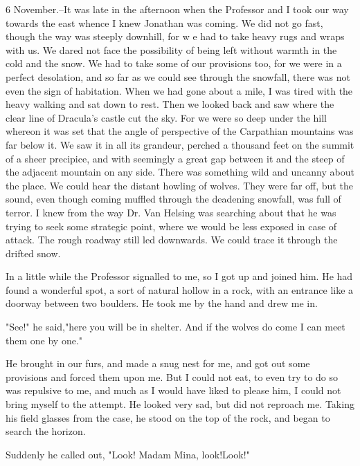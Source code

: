 6 November.--It was late in the afternoon when the Professor and I took our way towards the east whence I knew Jonathan was coming. We did not go fast, though the way was steeply downhill, for w e had to take heavy rugs and wraps with us. We dared not face the possibility of being left without warmth in the cold and the snow. We had to take some of our provisions too, for we were in a perfect desolation, and so far as we could see through the snowfall, there was not even the sign of habitation. When we had gone about a mile, I was tired with the heavy walking and sat down to rest. Then we looked back and saw where the clear line of Dracula's castle cut the sky. For we were so deep under the hill whereon it was set that the angle of perspective of the Carpathian mountains was far below it. We saw it in all its grandeur, perched a thousand feet on the summit of a sheer precipice, and with seemingly a great gap between it and the steep of the adjacent mountain on any side. There was something wild and uncanny about the place. We could hear the distant howling of wolves. They were far off, but the sound, even though coming muffled through the deadening snowfall, was full of terror. I knew from the way Dr. Van Helsing was searching about that he was trying to seek some strategic point, where we would be less exposed in case of attack. The rough roadway still led downwards. We could trace it through the drifted snow. 

In a little while the Professor signalled to me, so I got up and joined him. He had found a wonderful spot, a sort of natural hollow in a rock, with an entrance like a doorway between two boulders. He took me by the hand and drew me in. 

"See!" he said,"here you will be in shelter. And if the wolves do come I can meet them one by one." 

He brought in our furs, and made a snug nest for me, and got out some provisions and forced them upon me. But I could not eat, to even try to do so was repulsive to me, and much as I would have liked to please him, I could not bring myself to the attempt. He looked very sad, but did not reproach me. Taking his field glasses from the case, he stood on the top of the rock, and began to search the horizon. 

Suddenly he called out, "Look! Madam Mina, look!Look!" 

